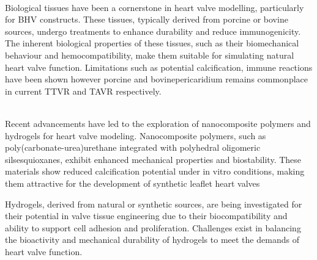 \\
Biological tissues have been a cornerstone in heart valve modelling, particularly for \gls{BHV} constructs. These tissues, typically derived from porcine or bovine sources, undergo treatments to enhance durability and reduce immunogenicity. The inherent biological properties of these tissues, such as their biomechanical behaviour and hemocompatibility, make them suitable for simulating natural heart valve function. Limitations such as potential calcification, immune reactions have been shown however porcine and bovinepericaridium remains commonplace in current \gls{TTVR} and \gls{TAVR} respectively. ~

\\
Recent advancements have led to the exploration of nanocomposite polymers  and hydrogels for heart valve modeling. Nanocomposite polymers, such as poly(carbonate-urea)urethane integrated with polyhedral oligomeric silsesquioxanes, exhibit enhanced mechanical properties and biostability. These materials show reduced calcification potential under in vitro conditions, making them attractive for the development of synthetic leaflet heart valves ~

Hydrogels, derived from natural or synthetic sources, are being investigated for their potential in valve tissue engineering due to their biocompatibility and ability to support cell adhesion and proliferation. Challenges exist in balancing the bioactivity and mechanical durability of hydrogels to meet the demands of heart valve function.

